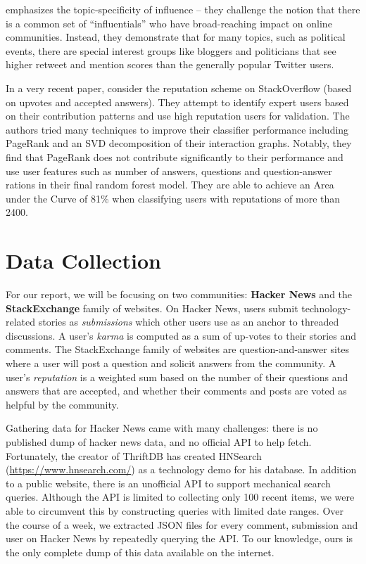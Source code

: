 \documentclass[10pt]{article}
\begin{document}
\citet{cha2010measuring} emphasizes the topic-specificity of influence -- they challenge
the notion that there is a common set of ``influentials'' who have
broad-reaching impact on online communities. Instead, they demonstrate that for
many topics, such as political events, there are special interest groups like
bloggers and politicians that see higher retweet and mention scores than the
generally popular Twitter users.

In a very recent paper, \citet{movshovitzanalysis} consider the reputation
scheme on StackOverflow (based on upvotes and accepted answers). They 
attempt to identify expert users based on their contribution
patterns and use high reputation users for validation. The authors tried many 
techniques to improve their classifier performance including PageRank and
an SVD decomposition of their interaction graphs. Notably, they find
that PageRank does not contribute significantly to their performance
and use user features such as number of answers, questions and question-answer 
rations in their final random forest model. They are
able to achieve an Area under the Curve of 81\% when classifying users
with reputations of more than 2400.


\section{Data Collection}
For our report, we will be focusing on two communities: \textbf{Hacker News}
and the \textbf{StackExchange} family of websites. On Hacker News, users submit
technology-related stories as \textit{submissions} which other users
use as an anchor to threaded discussions. A user's \textit{karma} is computed
as a sum of up-votes to their stories and comments. The StackExchange family of 
websites are question-and-answer sites where a user will post a question and
solicit answers from the community. A user's \textit{reputation} is a weighted
sum based on the number of their questions and answers that are accepted, and
whether their comments and posts are voted as helpful by the community.

Gathering data for Hacker News came with many challenges: there is no published
dump of hacker news data, and no official API to help fetch. Fortunately, the creator
of ThriftDB has created HNSearch (\url{https://www.hnsearch.com/}) as a technology
demo for his database. In addition to a public website, there is an unofficial API
to support mechanical search queries. Although the API is limited to collecting 
only 100 recent items, we were able to circumvent this by constructing queries with limited
date ranges. Over the course of a week, we extracted JSON files for every comment,
submission and user on Hacker News by repeatedly querying the API. To our knowledge,
ours is the only complete dump of this data available on the internet.
\end{document}

